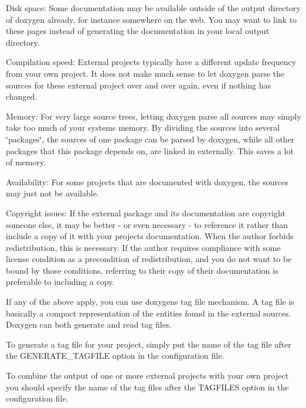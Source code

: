 \begin{DoxyDescription}
\item[Disk space\+:]Some documentation may be available outside of the output directory of doxygen already, for instance somewhere on the web. You may want to link to these pages instead of generating the documentation in your local output directory. 
\item[Compilation speed\+:]External projects typically have a different update frequency from your own project. It does not make much sense to let doxygen parse the sources for these external project over and over again, even if nothing has changed. 
\item[Memory\+:]For very large source trees, letting doxygen parse all sources may simply take too much of your system\textquotesingle{}s memory. By dividing the sources into several \char`\"{}packages\char`\"{}, the sources of one package can be parsed by doxygen, while all other packages that this package depends on, are linked in externally. This saves a lot of memory. 
\item[Availability\+:]For some projects that are documented with doxygen, the sources may just not be available. 
\item[Copyright issues\+:]If the external package and its documentation are copyright someone else, it may be better -\/ or even necessary -\/ to reference it rather than include a copy of it with your project\textquotesingle{}s documentation. When the author forbids redistribution, this is necessary. If the author requires compliance with some license condition as a precondition of redistribution, and you do not want to be bound by those conditions, referring to their copy of their documentation is preferable to including a copy.


\end{DoxyDescription}

If any of the above apply, you can use doxygen\textquotesingle{}s tag file mechanism. A tag file is basically a compact representation of the entities found in the external sources. Doxygen can both generate and read tag files.

To generate a tag file for your project, simply put the name of the tag file after the GENERATE\+\_\+\+TAGFILE option in the configuration file.

To combine the output of one or more external projects with your own project you should specify the name of the tag files after the TAGFILES option in the configuration file.

